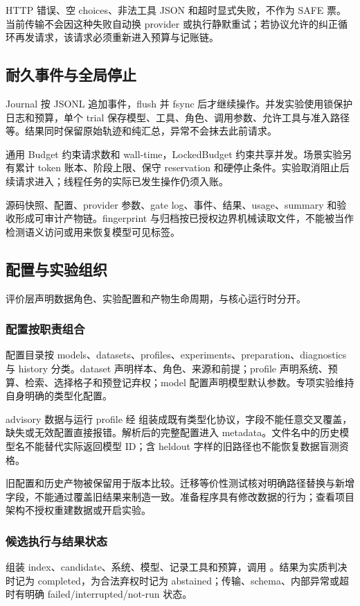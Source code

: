 HTTP 错误、空 choices、非法工具 JSON 和超时显式失败，不作为 SAFE 票。当前传输不会因这种失败自动换 provider 或执行静默重试；若协议允许的纠正循环再发请求，该请求必须重新进入预算与记账链。

\subsection{耐久事件与全局停止}
Journal 按 JSONL 追加事件，flush 并 fsync 后才继续操作。并发实验使用锁保护日志和预算，单个 trial 保存模型、工具、角色、调用参数、允许工具与准入路径等。结果同时保留原始轨迹和纯汇总，异常不会抹去此前请求。

通用 Budget 约束请求数和 wall-time，LockedBudget 约束共享并发。场景实验另有累计 token 账本、阶段上限、保守 reservation 和硬停止条件。实验取消阻止后续请求进入；线程任务的实际已发生操作仍须入账。

源码快照、配置、provider 参数、gate log、事件、结果、usage、summary 和验收形成可审计产物链。fingerprint 与归档按已授权边界机械读取文件，不能被当作检测语义访问或用来恢复模型可见标签。

\subsection{配置与实验组织}
评价层声明数据角色、实验配置和产物生命周期，与核心运行时分开。
\subsubsection{配置按职责组合}
配置目录按 models、datasets、profiles、experiments、preparation、diagnostics 与 history 分类。dataset 声明样本、角色、来源和前提；profile 声明系统、预算、检索、选择格子和预登记弃权；model 配置声明模型默认参数。专项实验维持自身明确的类型化配置。

advisory 数据与运行 profile 经  组装成既有类型化协议，字段不能任意交叉覆盖，缺失或无效配置直接报错。解析后的完整配置进入 metadata。文件名中的历史模型名不能替代实际返回模型 ID；含 heldout 字样的旧路径也不能恢复数据盲测资格。

旧配置和历史产物被保留用于版本比较。迁移等价性测试核对明确路径替换与新增字段，不能通过覆盖旧结果来制造一致。准备程序具有修改数据的行为；查看项目架构不授权重建数据或开启实验。

\subsubsection{候选执行与结果状态}
 组装 index、candidate、系统、模型、记录工具和预算，调用 。结果为实质判决时记为 completed，为合法弃权时记为 abstained；传输、schema、内部异常或超时有明确 failed/interrupted/not-run 状态。


